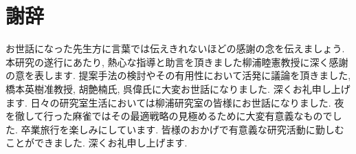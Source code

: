 \chapter*{謝辞}
お世話になった先生方に言葉では伝えきれないほどの感謝の念を伝えましょう. 
本研究の遂行にあたり, 熱心な指導と助言を頂きました柳浦睦憲教授に深く感謝の意を表します. 
提案手法の検討やその有用性において活発に議論を頂きました, 橋本英樹准教授, 胡艶楠氏, 呉偉氏に大変お世話になりました. 深くお礼申し上げます. 
日々の研究室生活においては柳浦研究室の皆様にお世話になりました. 
夜を徹して行った麻雀ではその最適戦略の見極めるために大変有意義なものでした. 
卒業旅行を楽しみにしています. 
皆様のおかげで有意義な研究活動に勤しむことができました. 深くお礼申し上げます. 
